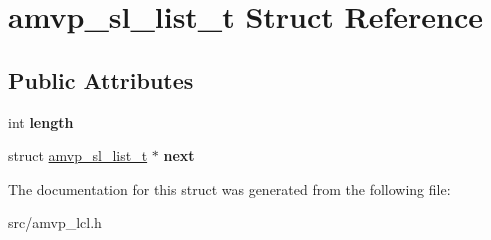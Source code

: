 \hypertarget{structamvp__sl__list__t}{\section{amvp\-\_\-sl\-\_\-list\-\_\-t Struct Reference}
\label{structamvp__sl__list__t}
}
\subsection*{Public Attributes}
\begin{DoxyCompactItemize}
\item 
\hypertarget{structamvp__sl__list__t_ad84c3d17bf85e4348f7005cafd42f6ed}{int {\bfseries length}}\label{structamvp__sl__list__t_ad84c3d17bf85e4348f7005cafd42f6ed}

\item 
\hypertarget{structamvp__sl__list__t_adccb2f791027b64c0a8b6122451f43f0}{struct \hyperlink{structamvp__sl__list__t}{amvp\-\_\-sl\-\_\-list\-\_\-t} $\ast$ {\bfseries next}}\label{structamvp__sl__list__t_adccb2f791027b64c0a8b6122451f43f0}

\end{DoxyCompactItemize}


The documentation for this struct was generated from the following file\-:\begin{DoxyCompactItemize}
\item 
src/amvp\-\_\-lcl.\-h\end{DoxyCompactItemize}
